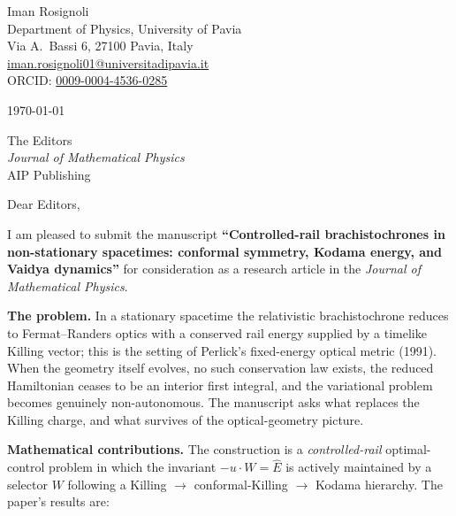 \documentclass[11pt]{article}
\begin{document}
\thispagestyle{empty}

\noindent
Iman Rosignoli\\
Department of Physics, University of Pavia\\
Via A.\ Bassi 6, 27100 Pavia, Italy\\
\href{mailto:iman.rosignoli01@universitadipavia.it}{iman.rosignoli01@universitadipavia.it}\\
ORCID: \href{https://orcid.org/0009-0004-4536-0285}{0009-0004-4536-0285}

\vspace{0.6em}
\noindent\today

\vspace{0.6em}
\noindent
The Editors\\
\emph{Journal of Mathematical Physics}\\
AIP Publishing

\vspace{0.6em}
\noindent Dear Editors,

\vspace{0.5em}
I am pleased to submit the manuscript \textbf{``Controlled-rail brachistochrones in
non-stationary spacetimes: conformal symmetry, Kodama energy, and Vaidya dynamics''} for
consideration as a research article in the \emph{Journal of Mathematical Physics}.

\vspace{0.3em}
\noindent\textbf{The problem.} In a stationary spacetime the relativistic brachistochrone
reduces to Fermat--Randers optics with a conserved rail energy supplied by a timelike
Killing vector; this is the setting of Perlick's fixed-energy optical metric (1991). When
the geometry itself evolves, no such conservation law exists, the reduced Hamiltonian
ceases to be an interior first integral, and the variational problem becomes genuinely
non-autonomous. The manuscript asks what replaces the Killing charge, and what survives of
the optical-geometry picture.

\vspace{0.3em}
\noindent\textbf{Mathematical contributions.} The construction is a \emph{controlled-rail}
optimal-control problem in which the invariant $-u\cdot W=\hat E$ is actively maintained by
a selector $W$ following a Killing $\to$ conformal-Killing $\to$ Kodama hierarchy. The
paper's results are:
\end{document}
